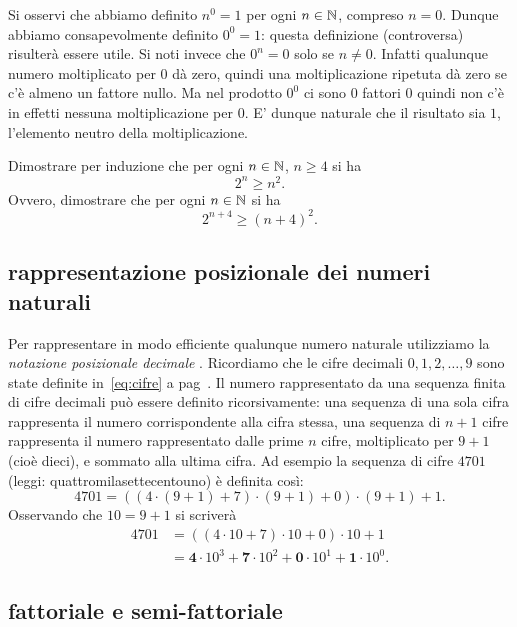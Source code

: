 Si osservi che abbiamo definito $n^0=1$ per ogni $n\in {\mathbb N}$,
compreso $n=0$. 
Dunque abbiamo consapevolmente definito $0^0=1$:
questa definizione (controversa) risulterà essere utile.
Si noti invece che $0^n=0$ solo se $n\neq 0$.
Infatti qualunque numero moltiplicato per $0$ dà zero, 
quindi una moltiplicazione ripetuta dà zero 
se c'è almeno un fattore nullo. 
Ma nel prodotto $0^0$ ci sono $0$ fattori $0$ quindi non c'è in effetti nessuna 
moltiplicazione per $0$. 
E' dunque naturale che il risultato sia $1$, 
l'elemento neutro della moltiplicazione.

\begin{exercise}
  Dimostrare per induzione che per ogni $n\in {\mathbb N}$, $n\ge 4$ si ha 
  \[  
    2^n \ge n^2.
  \]
  Ovvero, dimostrare che per ogni $n\in {\mathbb N}$ si ha 
  \[
    2^{n+4} \ge (n+4)^2.  
  \]
\end{exercise}

\subsection{rappresentazione posizionale dei numeri naturali}

Per rappresentare in modo efficiente qualunque numero naturale utilizziamo la 
\emph{notazione posizionale decimale}%
%
.
Ricordiamo che le cifre decimali $0,1,2,\dots, 9$ sono state definite in~\eqref{eq:cifre}
a pag~\pageref{eq:cifre}.
Il numero rappresentato da una sequenza finita di cifre decimali può essere 
definito ricorsivamente: una sequenza di una sola cifra rappresenta il numero 
corrispondente alla cifra stessa, una sequenza di $n+1$ cifre rappresenta il 
numero rappresentato dalle prime $n$ cifre, moltiplicato per $9+1$ (cioè dieci),
e sommato alla ultima cifra. 
Ad esempio la sequenza di cifre $4701$ (leggi: quattromilasettecentouno)
è definita così:
\[ 
  4701 = ((4\cdot(9+1)+7)\cdot(9+1)+0)\cdot(9+1)+1.
\]
Osservando che $10 = 9+1$ si scriverà
\begin{align*}
  4701 
  & = ((4\cdot 10 + 7)\cdot 10 +0)\cdot 10 + 1 \\
  & = \mathbf 4\cdot 10^3 + \mathbf 7\cdot 10^2 + \mathbf 0\cdot 10^1 + \mathbf 1 \cdot 10^0. 
\end{align*}

\subsection{fattoriale e semi-fattoriale}

